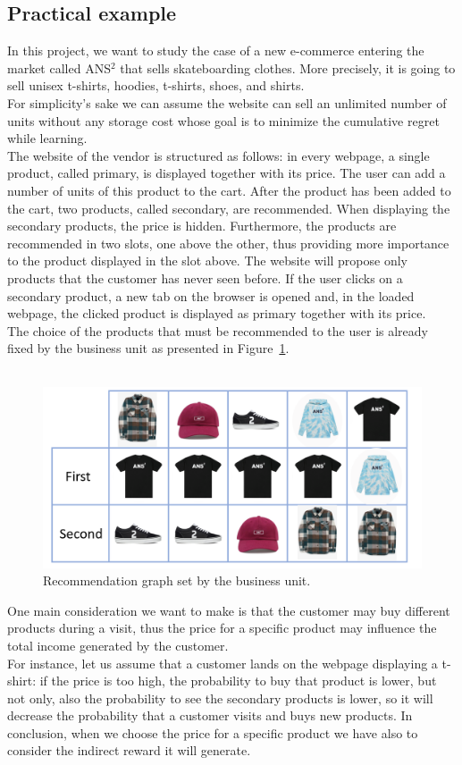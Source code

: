 \subsection*{Practical example}
In this project, we want to study the case of a new e-commerce entering the market called ANS$^2$ that sells skateboarding clothes. More precisely, it is going to sell unisex t-shirts, hoodies, t-shirts, shoes, and shirts.\\ For simplicity's sake we can assume the website can sell an unlimited number of units without any storage cost whose goal is to minimize the cumulative regret while learning.\\
The website of the vendor is structured as follows: in every webpage, a single product, called primary, is displayed together with its price. The user can add a number of units of this product to the cart. After the product has been added to the cart, two products, called secondary, are recommended. When displaying the secondary products, the price is hidden. Furthermore, the products are recommended in two slots, one above the other, thus providing more importance to the product displayed in the slot above. The website will propose only products that the customer has never seen before.
If the user clicks on a secondary product, a new tab on the browser is opened and, in the loaded webpage, the clicked product is displayed as primary together with its price.\\
The choice of the products that must be recommended to the user is already fixed by the business unit as presented in Figure~\ref{fig:business_graph}.\\\\
\begin{figure}
   \centering
    \includegraphics[scale=0.4]{img/products/business_graph.png}
    \caption{Recommendation graph set by the business unit.}
    \label{fig:business_graph}
\end{figure}
One main consideration we want to make is that the customer may buy different products during a visit, thus the price for a specific product may influence the total income generated by the customer.\\ For instance, let us assume that a customer lands on the webpage displaying a t-shirt: if the price is too high, the probability to buy that product is lower, but not only, also the probability to see the secondary products is lower, so it will decrease the probability that a customer visits and buys new products. In conclusion, when we choose the price for a specific product we have also to consider the indirect reward it will generate.
